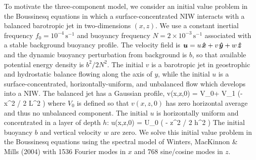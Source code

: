 \documentclass[12pt, oneside]{book}
\begin{document}
To motivate the three-component model, we consider an initial value problem in the Boussinesq equations in which a surface-concentrated NIW interacts with a balanced barotropic jet in two-dimensions $(x,z)$.  We use a constant inertial frequency $f_0 = 10^{-4} \, \mathrm{s^{-1}}$ and buoyancy frequency $N = 2 \times 10^{-3} \, \mathrm{s^{-1}}$ associated with a stable background buoyancy profile.  The velocity field is $\boldsymbol u = u \hspace{0.1em} \boldsymbol{\hat x} + v \hspace{0.1em}\boldsymbol{\hat y} + w \hspace{0.1em}\boldsymbol{\hat z}$ and the dynamic buoyancy perturbation from background is $b$, so that available potential energy density is $b^2 / 2 N^2$.  The initial $v$ is a barotropic jet in geostrophic and hydrostatic balance flowing along the axis of $y$, while the initial $u$ is a surface-concentrated, horizontally-uniform, and unbalanced flow which develops into a NIW.  The balanced jet has a Gaussian profile, 
\beq
v(x,z,0) = V_0+ V_1 \exp \left (-x^2 / 2  L^2 \right ) \com \label{jet1}
\eeq
where $V_0$ is defined so that $v(x,z,0)$ has zero horizontal average and thus no unbalanced component.  The initial $u$ is horizontally uniform and concentrated in a layer of depth $h$:
\beq
u(x,z,0) = U_0 \exp \left ( - z^2 / 2 h^2 \right ) \per \label{niw}
\eeq
The initial buoyancy $b$ and vertical velocity $w$ are zero. We solve this initial value problem in the Boussinesq equations using the spectral model  of Winters, MacKinnon \& Mills (2004) with 1536 Fourier modes in $x$ and 768 sine/cosine modes in $z$. \nocite{Winters}
\end{document}
